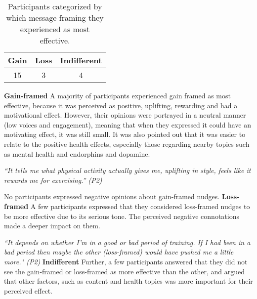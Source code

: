 \begin{table}[ht]
\begin{center}
\begin{tabular}{|c|c|c|}
\hline
\textbf{Gain} & \textbf{Loss} & \textbf{Indifferent} \\ \hline
15 & 3 & 4 \\ \hline
\end{tabular}
\caption{\label{tab:table-name} Participants categorized by which message framing they experienced as most effective.}
\end{center}
\end{table}

\bigbreak
\textbf{Gain-framed}
\bigbreak
A majority of participants experienced gain framed as most effective, because it was perceived as positive, uplifting, rewarding and had a motivational effect. However, their opinions were portrayed in a neutral manner (low voices and engagement), meaning that when they expressed it could have an motivating effect, it was still small. It was also pointed out that it was easier to relate to the positive health effects, especially those regarding nearby topics such as mental health and endorphins and dopamine. 

\textit{“It tells me what physical activity actually gives me, uplifting in style, feels like it rewards me for exercising.” (P2)}

 No participants expressed negative opinions about gain-framed nudges.
\bigbreak
\textbf{Loss-framed}
\bigbreak
A few participants expressed that they considered loss-framed nudges to be more effective due to its serious tone. The perceived negative connotations made a deeper impact on them. 

\textit{“It depends on whether I'm in a good or bad period of training. If I had been in a bad period then maybe the other (loss-framed) would have pushed me a little more." (P2)}
\bigbreak
\textbf{Indifferent}
\bigbreak
Further, a few participants answered that they did not see the gain-framed or loss-framed as more effective than  the other, and argued that other factors, such as content and health topics was more important for their perceived effect. 


